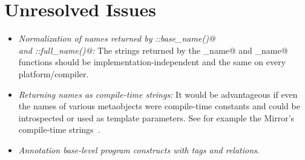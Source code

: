 \section{Unresolved Issues}

\begin{itemize}
	\item {\em Normalization of names returned by \verb@Named::base_name()@\\and \verb@Named::full_name()@:}
	The strings returned by the \verb@base_name@ and \verb@full_name@ functions should be
	implementation-independent and the same on every platform/compiler.
	
	\item {\em Returning names as compile-time strings:} It would be advantageous if even
	the names of various metaobjects were compile-time constants and could be introspected
	or used as template parameters. See for example the Mirror's compile-time strings~\cite{mirror-ct-strings}.

	\item {\em Annotation base-level program constructs with tags and relations}.
\end{itemize}
